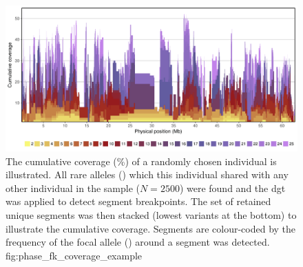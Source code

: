 

\begin{figure}[!htb]
\includegraphics[width=\textwidth]{./img/ch3/phase_fk_coverage_example}
{The cumulative coverage (\%) of a randomly chosen individual is illustrated.
All rare alleles (\fk{[2,25]}) which this individual shared with any other individual in the sample (${N=\num{2500}}$) were found and the \gls{dgt} was applied to detect segment breakpoints.
The set of retained unique segments was then stacked (lowest \fk{} variants at the bottom) to illustrate the cumulative coverage.
Segments are colour-coded by the frequency of the focal allele (\fk{}) around a segment was detected.}
{fig:phase_fk_coverage_example}
\end{figure}
